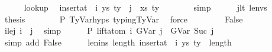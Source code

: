 \begin{isabellebody}
\isanewline
\ \ \ \ \isamarkupfalse%
\ lookup\ \isamarkupfalse%
\ {\isachardoublequoteopen}{\isacharparenleft}{\kern0pt}insert{\isacharunderscore}{\kern0pt}at\ {\isasymGamma}\ i\ {\isacharparenleft}{\kern0pt}ys{\isacharcomma}{\kern0pt}\ ty{}{\isacharparenright}{\kern0pt}{\isacharparenright}{\kern0pt}\ {\isacharbang}{\kern0pt}\ j\ {\isacharequal}{\kern0pt}\ {\isacharparenleft}{\kern0pt}xs{\isacharcomma}{\kern0pt}\ ty{\isacharparenright}{\kern0pt}{\isachardoublequoteclose}\isanewline
\ \ \ \ \ \ \isamarkupfalse%
\ simp\isanewline
\isanewline
\ \ \ \ \isamarkupfalse%
\ j{\isacharunderscore}{\kern0pt}lt{\isacharprime}{\kern0pt}\ len{\isacharunderscore}{\kern0pt}vs\isanewline
\ \ \ \ \isamarkupfalse%
\ {\isacharquery}{\kern0pt}thesis\isanewline
\ \ \ \ \ \ \isamarkupfalse%
\ P{}\ TyVar{\isachardot}{\kern0pt}hyps{\isacharparenleft}{\kern0pt}{}{\isacharcomma}{\kern0pt}{}{\isacharcomma}{\kern0pt}{}{\isacharparenright}{\kern0pt}\ typing{\isachardot}{\kern0pt}TyVar\ \isamarkupfalse%
\ force\isanewline
\ \ \isamarkupfalse%
\isanewline
\ \ \ \ \isamarkupfalse%
\ False\isanewline
\ \ \ \ \isamarkupfalse%
\ \isamarkupfalse%
\ i{\isacharunderscore}{\kern0pt}le{\isacharunderscore}{\kern0pt}j{\isacharcolon}{\kern0pt}\ {\isachardoublequoteopen}i\ {\isasymle}\ j{\isachardoublequoteclose}\ \isamarkupfalse%
\ simp\isanewline
\isanewline
\ \ \ \ \isamarkupfalse%
\ P{}{\isacharcolon}{\kern0pt}\ {\isachardoublequoteopen}lift{\isacharunderscore}{\kern0pt}atom\ i\ {\isacharparenleft}{\kern0pt}GVar\ j{\isacharparenright}{\kern0pt}\ {\isacharequal}{\kern0pt}\ GVar\ {\isacharparenleft}{\kern0pt}Suc\ j{\isacharparenright}{\kern0pt}{\isachardoublequoteclose}\isanewline
\ \ \ \ \ \ \isamarkupfalse%
\ {\isacharparenleft}{\kern0pt}simp\ add{\isacharcolon}{\kern0pt}\ False{\isacharparenright}{\kern0pt}\isanewline
\isanewline
\ \ \ \ \isamarkupfalse%
\ len{\isacharunderscore}{\kern0pt}ins{\isacharcolon}{\kern0pt}\ {\isachardoublequoteopen}length\ {\isacharparenleft}{\kern0pt}insert{\isacharunderscore}{\kern0pt}at\ {\isasymGamma}\ i\ {\isacharparenleft}{\kern0pt}ys{\isacharcomma}{\kern0pt}\ ty{}{\isacharparenright}{\kern0pt}{\isacharparenright}{\kern0pt}\ {\isacharequal}{\kern0pt}\ length\ {\isasymGamma}\ {\isacharplus}{\kern0pt}\ {}{\isachardoublequoteclose}\isanewline

\end{isabellebody}
